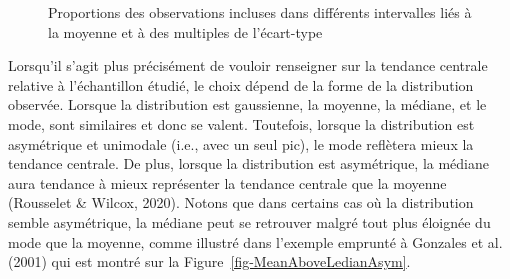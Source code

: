 \documentclass[
  letterpaper,
]{book}
\begin{document}
\begin{figure}


\caption{\label{fig-ObservationsWithinSdMutiplesGaussianDistri}Proportions
des observations incluses dans différents intervalles liés à la moyenne
et à des multiples de l'écart-type}

\end{figure}%

Lorsqu'il s'agit plus précisément de vouloir renseigner sur la tendance
centrale relative à l'échantillon étudié, le choix dépend de la forme de
la distribution observée. Lorsque la distribution est gaussienne, la
moyenne, la médiane, et le mode, sont similaires et donc se valent.
Toutefois, lorsque la distribution est asymétrique et unimodale (i.e.,
avec un seul pic), le mode reflètera mieux la tendance centrale. De
plus, lorsque la distribution est asymétrique, la médiane aura tendance
à mieux représenter la tendance centrale que la moyenne (Rousselet \&
Wilcox, 2020). Notons que dans certains cas où la distribution semble
asymétrique, la médiane peut se retrouver malgré tout plus éloignée du
mode que la moyenne, comme illustré dans l'exemple emprunté à Gonzales
et al. (2001) qui est montré sur la
Figure~\ref{fig-MeanAboveLedianAsym}.
\end{document}
